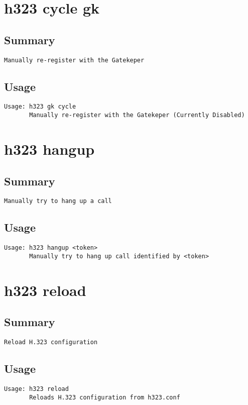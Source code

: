 \section{h323 cycle gk}
\subsection{Summary}
\begin{verbatim}
Manually re-register with the Gatekeper
\end{verbatim}
\subsection{Usage}
\begin{verbatim}
Usage: h323 gk cycle
       Manually re-register with the Gatekeper (Currently Disabled)

\end{verbatim}


\section{h323 hangup}
\subsection{Summary}
\begin{verbatim}
Manually try to hang up a call
\end{verbatim}
\subsection{Usage}
\begin{verbatim}
Usage: h323 hangup <token>
       Manually try to hang up call identified by <token>

\end{verbatim}


\section{h323 reload}
\subsection{Summary}
\begin{verbatim}
Reload H.323 configuration
\end{verbatim}
\subsection{Usage}
\begin{verbatim}
Usage: h323 reload
       Reloads H.323 configuration from h323.conf

\end{verbatim}


